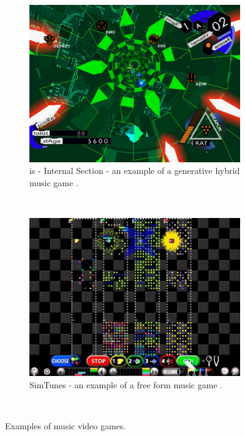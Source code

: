 \begin{figure}
        \centering
        \begin{subfigure}[b]{0.48\textwidth}
                \includegraphics[width=\textwidth]{Figures/is}
                \caption{is - Internal Section - an example of a generative hybrid music game \cite{is}.}
                \label{fig:is }
        \end{subfigure}%
        ~ %
        \begin{subfigure}[b]{0.48\textwidth}
                \includegraphics[width=\textwidth]{Figures/simtunes}
                \caption{SimTunes - an example of a free form music game \cite{simtunes}.}
                \label{fig:simtunes}
        \end{subfigure}
          \caption{Examples of music video games.}
        ~ %
        \label{fig:simtunesandis}
\end{figure}


